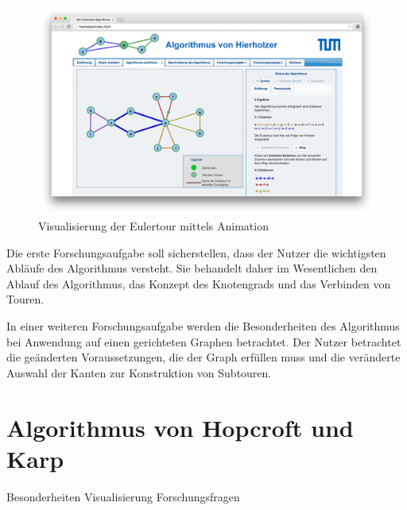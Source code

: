 \begin{figure}[h!]
	\centering
	\includegraphics[width=\textwidth]{figures/hierholzer_animation}
	\caption[Eulertour Animation]{Visualisierung der Eulertour mittels Animation}\label{fig:hierholzer-animation}
\end{figure}

Die erste Forschungsaufgabe soll sicherstellen, dass der Nutzer die wichtigsten Abläufe des Algorithmus versteht. Sie behandelt daher im Wesentlichen den Ablauf des Algorithmus, das Konzept des Knotengrads und das Verbinden von Touren.

In einer weiteren Forschungsaufgabe werden die Besonderheiten des Algorithmus bei Anwendung auf einen gerichteten Graphen betrachtet. Der Nutzer betrachtet die geänderten Voraussetzungen, die der Graph erfüllen muss und die veränderte Auswahl der Kanten zur Konstruktion von Subtouren.
     
\section{Algorithmus von Hopcroft und Karp}
Besonderheiten Visualisierung
Forschungsfragen

